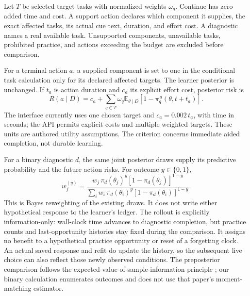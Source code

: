 \documentclass{article}
\newcommand{\E}{\mathbb{E}}
\begin{document}
Let \(T\) be selected target tasks with normalized weights \(\omega_q\).
Continue has zero added time and cost. A support action declares which
component it supplies, the exact affected tasks, its actual cue text, duration,
and effort cost. A diagnostic names a real available task. Unsupported
components, unavailable tasks, prohibited practice, and actions exceeding the
budget are excluded before comparison.

For a terminal action \(a\), a supplied component is set to one in the
conditional task calculation only for its declared affected targets.
The learner posterior is unchanged. If \(t_a\) is action duration and
\(c_a\) its explicit effort cost, posterior risk is
\begin{equation}
 R(a\mid D)=c_a+
 \sum_{q\in T}\omega_q
 \E_{\theta\mid D}[1-\pi_q^{\,a}(\theta,t+t_a)].
\label{eq:risk}
\end{equation}
The interface currently uses one chosen target and
\(c_a=0.002\,t_a\), with time in seconds; the API permits explicit costs and
multiple weighted targets. These units are authored utility assumptions.
The criterion concerns immediate aided completion, not durable learning.

For a binary diagnostic \(d\), the same joint posterior draws supply
its predictive probability and the future action risks. For outcome
\(y\in\{0,1\}\),
\begin{equation}
 w_j^{(y)}=
 \frac{w_j\,\pi_d(\theta_j)^y[1-\pi_d(\theta_j)]^{1-y}}
 {\sum_iw_i\,\pi_d(\theta_i)^y[1-\pi_d(\theta_i)]^{1-y}}.
\label{eq:reweight}
\end{equation}
This is Bayes reweighting of the existing draws. It does not write either
hypothetical response to the learner's ledger. The rollout is explicitly
information-only: wall-clock time advances to diagnostic completion, but
practice counts and last-opportunity histories stay fixed during the
comparison. It assigns no benefit to a hypothetical practice opportunity
or reset of a forgetting clock. An actual saved response and refit do update
the history, so the subsequent live choice can also reflect those newly
observed conditions. The preposterior comparison follows
the expected-value-of-sample-information principle
\citep{heath2018efficient}; our binary calculation enumerates outcomes and
does not use that paper's moment-matching estimator.
\end{document}
